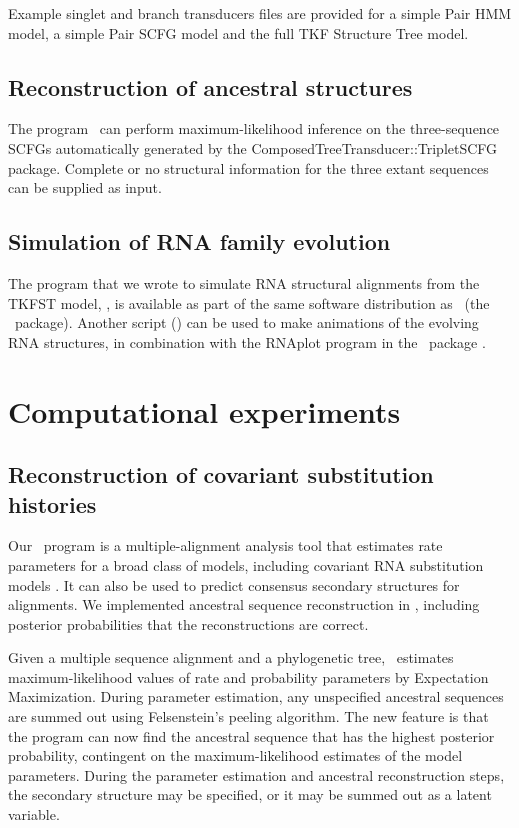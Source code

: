 \documentclass[10pt]{article}
\begin{document}
Example singlet and branch transducers files are provided for a simple 
Pair HMM model, a simple Pair SCFG model and the full TKF Structure Tree model.

\subsection{Reconstruction of ancestral structures}
The program \indiegram\ can perform maximum-likelihood inference on the
three-sequence SCFGs automatically generated by the ComposedTreeTransducer::TripletSCFG package.
Complete or no structural information for the three extant sequences can be supplied
as input.

\subsection{Simulation of RNA family evolution}
The program that we wrote to simulate RNA structural alignments from the TKFST model, \evolsayer, is available as part of the same software distribution as \indiegram\ (the \dart\ package).
Another script (\animateevolsayer) can be used to make animations of the evolving RNA structures, in combination with the RNAplot program in the \viennarna\ package \cite{HofackerEtAl94}.



\newpage
\section{Computational experiments}

\subsection{Reconstruction of covariant substitution histories}

Our \xrate\ program is a multiple-alignment analysis tool
that estimates rate parameters for a broad class of models, including covariant RNA substitution models \cite{KlostermanEtAl2006}.
It can also be used to predict consensus secondary structures for alignments.
We implemented ancestral sequence reconstruction in \xrate, including posterior probabilities that the reconstructions are correct.

Given a multiple sequence alignment and a phylogenetic tree,
\xrate\ estimates maximum-likelihood values of rate and probability parameters by Expectation Maximization.
During parameter estimation, any unspecified ancestral sequences are summed out using Felsenstein's peeling algorithm.
The new feature is that the program can now find the ancestral sequence that has the highest posterior probability,
contingent on the maximum-likelihood estimates of the model parameters.
During the parameter estimation and ancestral reconstruction steps, the secondary structure may be specified, or it may be summed out as a latent variable.
\end{document}
